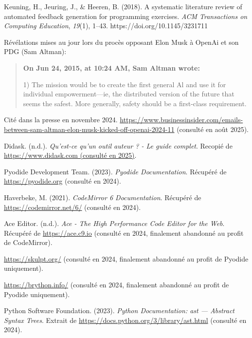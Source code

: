 \documentclass[11pt,a4paper]{article}
\begin{document}
\begin{thebibliography}{99}
Keuning, H., Jeuring, J., \& Heeren, B. (2018).
A systematic literature review of automated feedback generation for programming exercises.
\textit{ACM Transactions on Computing Education}, \textit{19}(1), 1--43.
https://doi.org/10.1145/3231711

 Révélations mises au jour lors du procès opposant Elon Musk à OpenAi et son PDG (Sam Altman):
\begin{quote}
    \textbf{On Jun 24, 2015, at 10:24 AM, Sam Altman wrote:}

1) The mission would be to create the first general Al and use it for individual empowerment—ie, the distributed version of the future that seems the safest. More generally, safety should be a first-class requirement.
\end{quote} Cité dans la presse en novembre 2024. \url{https://www.businessinsider.com/emails-between-sam-altman-elon-musk-kicked-off-openai-2024-11} (consulté en août 2025).

 Didask. (n.d.). \textit{Qu'est-ce qu'un outil auteur ? - Le guide complet}. Recopié de \url{https://www.didask.com (consulté en 2025)}.

 Pyodide Development Team. (2023). \textit{Pyodide Documentation}. Récupéré de \url{https://pyodide.org} (consulté en 2024).

 Haverbeke, M. (2021). \textit{CodeMirror 6 Documentation}. Récupéré de \url{https://codemirror.net/6/} (consulté en 2024).

 Ace Editor. (n.d.). \textit{Ace - The High Performance Code Editor for the Web}. Récupéré de \url{https://ace.c9.io} (consulté en 2024, finalement abandonné au profit de CodeMirror).

 \url{https://skulpt.org/} (consulté en 2024, finalement abandonné au profit de Pyodide uniquement).

 \url{https://brython.info/} (consulté en 2024, finalement abandonné au profit de Pyodide uniquement).

 Python Software Foundation. (2023). \textit{Python Documentation: ast --- Abstract Syntax Trees}. Extrait de \url{https://docs.python.org/3/library/ast.html} (consulté en 2024).


\end{thebibliography}
\end{document}
